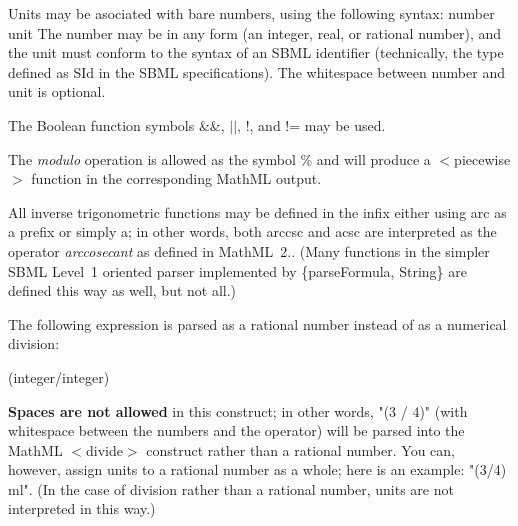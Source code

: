 \begin{DoxyItemize}
\item Units may be asociated with bare numbers, using the following syntax\+:  number unit  The number may be in any form (an integer, real, or rational number), and the unit must conform to the syntax of an S\+B\+ML identifier (technically, the type defined as {\ttfamily S\+Id} in the S\+B\+ML specifications). The whitespace between number and unit is optional.\end{DoxyItemize}
\begin{DoxyItemize}
\item The Boolean function symbols {\ttfamily \&\&}, {\ttfamily $\vert$$\vert$}, {\ttfamily !}, and {\ttfamily !=} may be used.\end{DoxyItemize}
\begin{DoxyItemize}
\item The {\itshape modulo} operation is allowed as the symbol {\ttfamily \%} and will produce a {\ttfamily $<$piecewise$>$} function in the corresponding Math\+ML output.\end{DoxyItemize}
\begin{DoxyItemize}
\item All inverse trigonometric functions may be defined in the infix either using {\ttfamily arc} as a prefix or simply {\ttfamily a}; in other words, both {\ttfamily arccsc} and {\ttfamily acsc} are interpreted as the operator {\itshape arccosecant} as defined in Math\+ML~2.. (Many functions in the simpler S\+B\+ML Level~1 oriented parser implemented by \{parse\+Formula, String\} are defined this way as well, but not all.)\end{DoxyItemize}
\begin{DoxyItemize}
\item The following expression is parsed as a rational number instead of as a numerical division\+: 
\begin{DoxyPre}
   (integer/integer)\end{DoxyPre}
 {\bfseries Spaces are not allowed} in this construct; in other words, "{\ttfamily (3 / 4)}" (with whitespace between the numbers and the operator) will be parsed into the Math\+ML {\ttfamily $<$divide$>$} construct rather than a rational number. You can, however, assign units to a rational number as a whole; here is an example\+: "{\ttfamily (3/4) ml}". (In the case of division rather than a rational number, units are not interpreted in this way.)\end{DoxyItemize}
